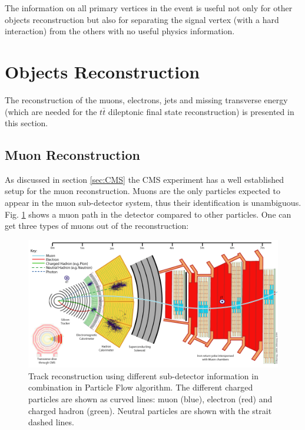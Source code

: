 The information on all primary vertices in the event is useful not only for other objects reconstruction but also for separating the signal vertex (with a hard interaction) 
from the others with no useful physics information.

\section{Objects Reconstruction}

The reconstruction of the muons, electrons, jets and missing transverse energy (which are needed for the $t\bar{t}$ dileptonic final
state reconstruction) is presented in this section.

\subsection{Muon Reconstruction}

As discussed in section \ref{sec:CMS} the CMS experiment has a well established setup for the muon reconstruction.
Muons are the only particles expected to appear in the muon sub-detector system, thus their identification is unambiguous.
Fig. \ref{fig:PFmuons} shows a muon path in the detector compared to other particles.
One can get three types of muons out of the reconstruction:

\begin{figure}[t]
  \centering
  \includegraphics[width=1.0\textwidth]{04_event_reconstruction/plots/CMS_Slice.png}
  \caption{Track reconstruction using different sub-detector information in combination in Particle Flow algorithm. The different
  charged particles are shown as curved lines: muon (blue), electron (red) and charged hadron (green). Neutral particles are shown
  with the strait dashed lines.}
  \label{fig:PFmuons}
\end{figure}

